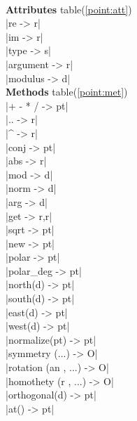 \documentclass[DIV         = 14,
               fontsize    = 10,
               index       = totoc,
               twoside,
               cadre,
               headings    = small
               ]{tkz-doc}
\begin{document}
\begin{multicols}{3}

\\
\textbf{Attributes} table(\ref{point:att})   \\
|re                        -> r|   \\
|im                        -> r|   \\
|type                      -> s|   \\
|argument                  -> r|   \\
|modulus                   -> d|   \\
\textbf{Methods} table(\ref{point:met})      \\
|+ - * /                   -> pt|  \\
|..                        -> r|   \\
|^                         -> r|   \\
|conj                      -> pt|  \\
|abs                       -> r|  \\
|mod                       -> d|    \\
|norm                      -> d|    \\
|arg                       -> d|   \\
|get                       -> r,r| \\
|sqrt                      -> pt|  \\
|new                       -> pt|  \\
|polar                     -> pt|  \\
|polar_deg                 -> pt|  \\
|north(d)                  -> pt|  \\
|south(d)                  -> pt|  \\
|east(d)                   -> pt|  \\
|west(d)                   -> pt|  \\
|normalize(pt)             -> pt|  \\
|symmetry (...)            -> O|   \\
|rotation (an , ...)       -> O|   \\
|homothety (r , ...)       -> O|   \\
|orthogonal(d)             -> pt|  \\
|at()                      -> pt|  \\
                                   \\

\end{multicols}
\end{document}
